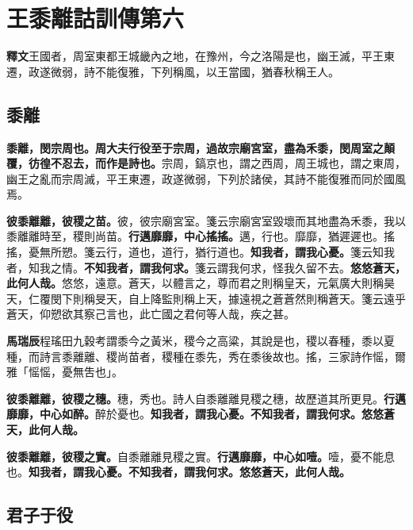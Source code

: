 \chapter{王黍離詁訓傳第六}

\begin{quoting}\textbf{釋文}王國者，周室東都王城畿內之地，在豫州，今之洛陽是也，幽王滅，平王東遷，政遂微弱，詩不能復雅，下列稱風，以王當國，猶春秋稱王人。\end{quoting}

\section{黍離}


\textbf{黍離，閔宗周也。周大夫行役至于宗周，過故宗廟宮室，盡為禾黍，閔周室之顛覆，彷徨不忍去，而作是詩也。}{\footnotesize 宗周，鎬京也，謂之西周，周王城也，謂之東周，幽王之亂而宗周滅，平王東遷，政遂微弱，下列於諸侯，其詩不能復雅而同於國風焉。}

\textbf{彼黍離離，彼稷之苗。}{\footnotesize 彼，彼宗廟宮室。箋云宗廟宮室毀壞而其地盡為禾黍，我以黍離離時至，稷則尚苗。}\textbf{行邁靡靡，中心搖搖。}{\footnotesize 邁，行也。靡靡，猶遲遲也。搖搖，憂無所愬。箋云行，道也，道行，猶行道也。}\textbf{知我者，謂我心憂。}{\footnotesize 箋云知我者，知我之情。}\textbf{不知我者，謂我何求。}{\footnotesize 箋云謂我何求，怪我久留不去。}\textbf{悠悠蒼天，此何人哉。}{\footnotesize 悠悠，遠意。蒼天，以體言之，尊而君之則稱皇天，元氣廣大則稱昊天，仁覆閔下則稱旻天，自上降監則稱上天，據遠視之蒼蒼然則稱蒼天。箋云遠乎蒼天，仰愬欲其察己言也，此亡國之君何等人哉，疾之甚。}

\begin{quoting}\textbf{馬瑞辰}程瑤田九穀考謂黍今之黃米，稷今之高粱，其說是也，稷以春種，黍以夏種，而詩言黍離離、稷尚苗者，稷種在黍先，秀在黍後故也。搖，三家詩作愮，爾雅「愮愮，憂無吿也」。\end{quoting}

\textbf{彼黍離離，彼稷之穗。}{\footnotesize 穗，秀也。詩人自黍離離見稷之穗，故歷道其所更見。}\textbf{行邁靡靡，中心如醉。}{\footnotesize 醉於憂也。}\textbf{知我者，謂我心憂。不知我者，謂我何求。悠悠蒼天，此何人哉。}

\textbf{彼黍離離，彼稷之實。}{\footnotesize 自黍離離見稷之實。}\textbf{行邁靡靡，中心如噎。}{\footnotesize 噎，憂不能息也。}\textbf{知我者，謂我心憂。不知我者，謂我何求。悠悠蒼天，此何人哉。}

\section{君子于役}

